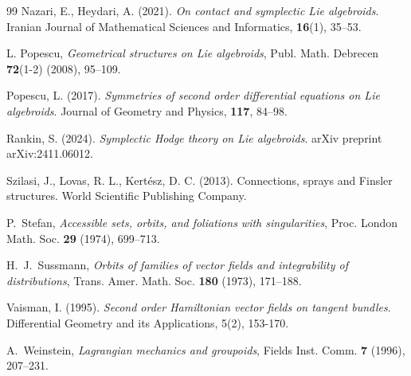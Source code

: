 \documentclass[12pt,letterpaper]{article}
\numberwithin{equation}{section}
\begin{document}
\begin{thebibliography}{99}
 Nazari, E., Heydari, A. (2021). \emph{ On contact and symplectic Lie algebroids}. Iranian Journal of Mathematical Sciences and Informatics, \textbf{16}(1), 35--53.

 L. Popescu, \textit{Geometrical structures on Lie algebroids}, Publ. Math. Debrecen \textbf{72}(1-2) (2008), 95--109.

 Popescu, L. (2017). \emph{ Symmetries of second order differential equations on Lie algebroids}. Journal of Geometry and Physics, \textbf{117}, 84--98.

 Rankin, S. (2024). \emph{ Symplectic Hodge theory on Lie algebroids}. arXiv preprint arXiv:2411.06012.

 Szilasi, J., Lovas, R. L.,  Kertész, D. C. (2013). Connections, sprays and Finsler structures. World Scientific Publishing Company.

P.~Stefan,
\emph{Accessible sets, orbits, and foliations with singularities},
Proc. London Math. Soc. \textbf{29} (1974), 699--713.

H.~J.~Sussmann,
\emph{Orbits of families of vector fields and integrability of distributions},
Trans. Amer. Math. Soc. \textbf{180} (1973), 171--188.


  Vaisman, I. (1995). \emph{ Second order Hamiltonian vector fields on tangent bundles}. Differential Geometry and its Applications, 5(2), 153-170.

 A.~Weinstein, \textit{Lagrangian mechanics and groupoids}, Fields Inst. Comm. \textbf{7} (1996), 207--231.


\end{thebibliography}
\end{document}
